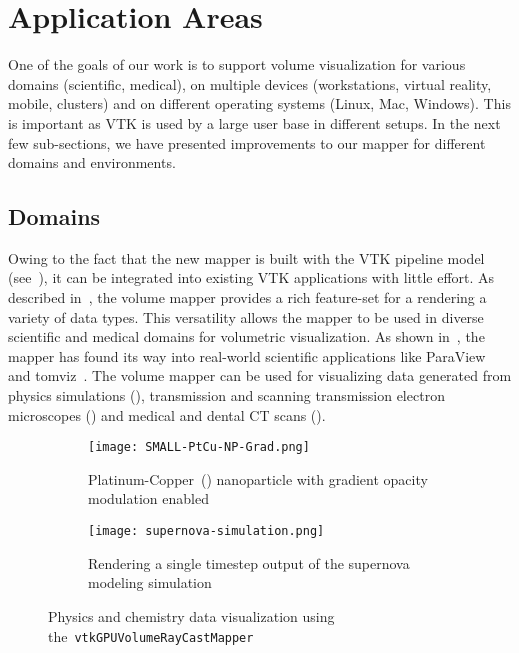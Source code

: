 \section{Application Areas}
\label{applicationareas}

One of the goals of our work is to support volume visualization for various
domains (scientific, medical), on multiple devices (workstations, virtual
reality, mobile, clusters) and on different operating systems (Linux, Mac,
Windows). This is important as VTK is used by a large user base in different
setups.  In the next few sub-sections, we have presented improvements to our
mapper for different domains and environments.

\subsection{Domains}
\label{domains}

Owing to the fact that the new mapper is built with the VTK pipeline model
(see~), it can be integrated into existing VTK
applications with little effort. As described
in~, the volume mapper provides a rich
feature-set for a rendering a variety of data types. This versatility allows the
mapper to be used in diverse scientific and medical domains for volumetric
visualization. As shown in~, the mapper has found its way into real-world scientific
applications like ParaView~\citep{ahrens_paraview:_2005, ayachit_paraview_2015,
ayachit_paraview_2015-1} and tomviz~\citep{hanwell_tomviz_2014}. The volume
mapper can be used for
visualizing data generated from physics simulations (),
transmission and scanning transmission electron microscopes
() and medical and dental CT scans
(). 

\begin{figure}[htb]
  \begin{subfigure}[t]{0.49\columnwidth}
    \texttt{[image: SMALL-PtCu-NP-Grad.png]}
    \caption{Platinum-Copper~()
      nanoparticle \protect\citep{scott_electron_2012, miao_atomic_2016} with
      gradient opacity modulation enabled}
    \label{fig:ptcu-grad}
  \end{subfigure}\hfill%
  \begin{subfigure}[t]{0.49\columnwidth}
    \texttt{[image: supernova-simulation.png]}
    \caption{Rendering a single timestep output of the supernova modeling
      simulation~\protect\citep{blondin_pulsar_2007}}
    \label{fig:supernova}
  \end{subfigure}
  \caption{Physics and chemistry data visualization using
    the~\texttt{vtkGPUVolumeRayCastMapper}}
  \label{fig:domains}
\end{figure}

